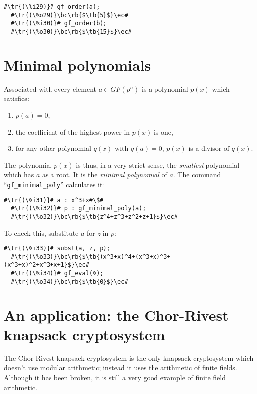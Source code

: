 \documentclass[a4paper,11pt,leqno,fleqn]{artikel3}
\newcommand{\bc}{\begin{center}}
\newcommand{\ec}{\end{center}}
\newcommand{\tr}[1]{\textcolor{red}{#1}}
\newcommand{\tb}[1]{\textcolor{blue}{#1}}
\newcommand{\rb}[1]{\raisebox{2mm}[0mm][1mm]{#1}}
\begin{document}
\vspace*{2mm}
\begin{lstlisting}[escapechar=\#]
  #\tr{(\%i29)}# gf_order(a);
  #\tr{(\%o29)}\bc\rb{$\tb{5}$}\ec#
  #\tr{(\%i30)}# gf_order(b);
  #\tr{(\%o30)}\bc\rb{$\tb{15}$}\ec#
\end{lstlisting}


\section*{Minimal polynomials}

Associated with every element $a\in GF(p^n)$ is a polynomial $p(x)$ which
satisfies:
\begin{enumerate}
\item $p(a)=0$,
\item the coefficient of the highest power in $p(x)$ is one,
\item for any other polynomial $q(x)$ with $q(a)=0$, $p(x)$ is a divisor of $q(x)$.
\end{enumerate}
The polynomial $p(x)$ is thus, in a very strict sense, the \emph{smallest}
polynomial which has $a$ as a root.  It is the \emph{minimal polynomial} of
$a$.  The command ``\verb!gf_minimal_poly!'' calculates it:

\vspace*{2mm}
\begin{lstlisting}[escapechar=\#]
  #\tr{(\%i31)}# a : x^3+x#\$#
  #\tr{(\%i32)}# p : gf_minimal_poly(a);
  #\tr{(\%o32)}\bc\rb{$\tb{z^4+z^3+z^2+z+1}$}\ec#
\end{lstlisting}

To check this, substitute $a$ for $z$ in $p$:

\vspace*{2mm}
\begin{lstlisting}[escapechar=\#]
  #\tr{(\%i33)}# subst(a, z, p);
  #\tr{(\%o33)}\bc\rb{$\tb{(x^3+x)^4+(x^3+x)^3+(x^3+x)^2+x^3+x+1}$}\ec#
  #\tr{(\%i34)}# gf_eval(%);
  #\tr{(\%o34)}\bc\rb{$\tb{0}$}\ec#
\end{lstlisting}


\section*{An application: the Chor-Rivest knapsack cryptosystem}

The Chor-Rivest knapsack cryptosystem is the only knapsack cryptosystem which
doesn't use modular arithmetic; instead it uses the arithmetic of finite
fields.  Although it has been broken, it is still a very good example of
finite field arithmetic.
\end{document}
